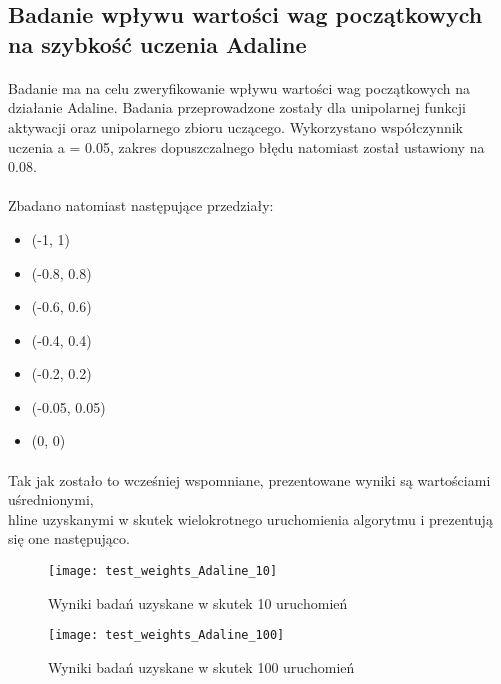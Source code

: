 \documentclass[\main/main.tex]{subfiles}
\begin{document}
    \justify
    \subsection{Badanie wpływu wartości wag początkowych na szybkość uczenia Adaline}
    \paragraph{}
    Badanie ma na celu zweryfikowanie wpływu wartości wag początkowych na działanie Adaline. Badania przeprowadzone zostały dla unipolarnej funkcji aktywacji oraz unipolarnego zbioru uczącego. Wykorzystano współczynnik uczenia a = 0.05, zakres dopuszczalnego błędu natomiast został ustawiony na 0.08.
    
    \paragraph{}
    Zbadano natomiast następujące przedziały:
    \begin{itemize}
     \item (-1, 1)
     \item (-0.8,  0.8)
     \item (-0.6, 0.6)
     \item (-0.4, 0.4)
     \item (-0.2, 0.2)
     \item (-0.05, 0.05)
     \item (0, 0)
    \end{itemize}
    
    \paragraph{}
    Tak jak zostało to wcześniej wspomniane, prezentowane wyniki są wartościami uśrednionymi, \\hline
    uzyskanymi w skutek wielokrotnego uruchomienia algorytmu i prezentują się one następująco.

    \begin{figure}[H]
    \centering
    \texttt{[image: test\_weights\_Adaline\_10]}
    \caption{Wyniki badań uzyskane w skutek 10 uruchomień}
    \end{figure}

    \begin{figure}[H]
    \centering
    \texttt{[image: test\_weights\_Adaline\_100]}
    \caption{Wyniki badań uzyskane w skutek 100 uruchomień}
    \end{figure}
    
\end{document}
